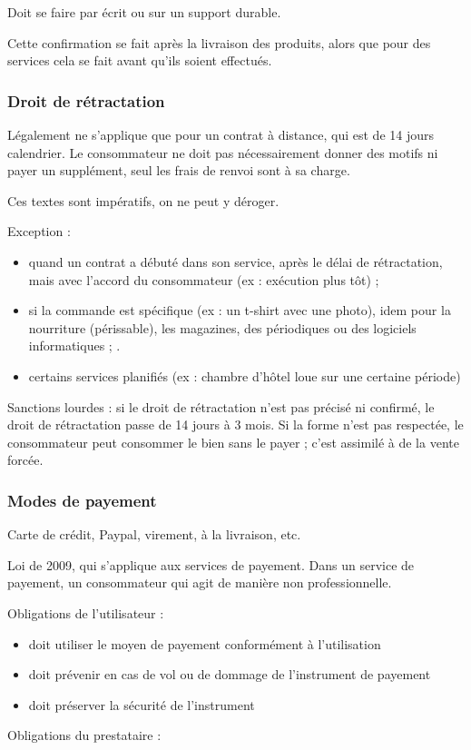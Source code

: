 		Doit se faire par écrit ou sur un support durable.
		
		Cette confirmation se fait après la livraison des produits, alors que pour des services cela se fait avant qu'ils soient effectués.
			\subsubsection{Droit de rétractation}
			
			Légalement ne s'applique que pour un contrat à distance, qui est de 14 jours calendrier. Le consommateur ne doit pas nécessairement donner des motifs ni payer un supplément, seul les frais de renvoi sont à sa charge.
			
			Ces textes sont impératifs, on ne peut y déroger.
			
			Exception :
			
			\begin{itemize}
				\item quand un contrat a débuté dans son service, après le délai de rétractation, mais avec l'accord du consommateur (ex : exécution plus tôt) ;
				\item si la commande est spécifique (ex : un t-shirt avec une photo), idem pour la nourriture (périssable), les magazines, des périodiques ou des logiciels informatiques ;
.				\item certains services planifiés (ex : chambre d'hôtel loue sur une certaine période)
			\end{itemize}
			
			Sanctions lourdes : si le droit de rétractation n'est pas précisé ni confirmé, le droit de rétractation passe de 14 jours à 3 mois. Si la forme n'est pas respectée, le consommateur peut consommer le bien sans le payer ; c'est assimilé à de la vente forcée.
			
			\subsubsection{Modes de payement}
			
			Carte de crédit, Paypal, virement, à la livraison, etc.
			
			Loi de 2009, qui s'applique aux services de payement. Dans un service de payement, un consommateur qui agit de manière non professionnelle.
			
			Obligations de l'utilisateur :
			
			\begin{itemize}
				\item doit utiliser le moyen de payement conformément à l'utilisation
				\item doit prévenir en cas de vol ou de dommage de l'instrument de payement
				\item doit préserver la sécurité de l'instrument
			\end{itemize}
			\pagebreak
			Obligations du prestataire :
			
